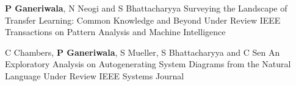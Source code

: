 


\begin{cventries}
\cventry
{\textbf{P Ganeriwala}, N Neogi and S Bhattacharyya}
{Surveying the Landscape of Transfer Learning: Common Knowledge and Beyond}
{Under Review}
{IEEE Transactions on Pattern Analysis and Machine Intelligence} 
{ %
\begin{cvitems}
\end{cvitems}
}
\cventry
{C Chambers, \textbf{P Ganeriwala}, S Mueller, S Bhattacharyya and C Sen}
{An Exploratory Analysis on Autogenerating System Diagrams from the Natural Language}
{Under Review}
{IEEE Systems Journal} 
{ %
\begin{cvitems}
\end{cvitems}
}
\end{cventries}
